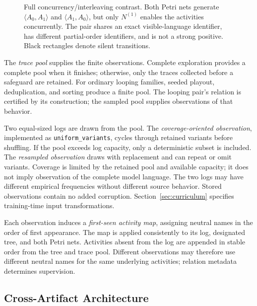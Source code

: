 \documentclass[mathematics,article,submit,moreauthors]{Definitions/mdpi}
\begin{document}
\begin{figure}[!htb]
{%
}
\caption{Full concurrency/interleaving contrast. Both Petri nets generate $\langle A_0,A_1\rangle$ and $\langle A_1,A_0\rangle$, but only $N^{(1)}$ enables the activities concurrently. The pair shares an exact visible-language identifier, has different partial-order identifiers, and is not a strong positive. Black rectangles denote silent transitions.}
\label{fig:concurrency-nets}
\end{figure}

The \emph{trace pool} supplies the finite observations. Complete exploration provides a complete pool when it finishes; otherwise, only the traces collected before a safeguard are retained. For ordinary looping families, seeded playout, deduplication, and sorting produce a finite pool. The looping pair's relation is certified by its construction; the sampled pool supplies observations of that behavior.

Two equal-sized logs are drawn from the pool. The \emph{coverage-oriented observation}, implemented as \texttt{uniform\_variants}, cycles through retained variants before shuffling. If the pool exceeds log capacity, only a deterministic subset is included. The \emph{resampled observation} draws with replacement and can repeat or omit variants. Coverage is limited by the retained pool and available capacity; it does not imply observation of the complete model language. The two logs may have different empirical frequencies without different source behavior. Stored observations contain no added corruption. Section~\ref{sec:curriculum} specifies training-time input transformations.

Each observation induces a \emph{first-seen activity map}, assigning neutral names in the order of first appearance. The map is applied consistently to its log, designated tree, and both Petri nets. Activities absent from the log are appended in stable order from the tree and trace pool. Different observations may therefore use different neutral names for the same underlying activities; relation metadata determines supervision.

\subsection{Cross-Artifact Architecture}\label{sec:architecture}
\end{document}
